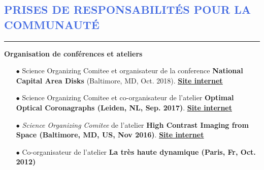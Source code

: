 \documentclass[11pt,a4paper, french]{article}
\begin{document}
\vspace{-0.3cm}
\textcolor{RoyalBlue}{\section{\large PRISES DE RESPONSABILITÉS POUR LA COMMUNAUTÉ}
\vspace{-0.2cm}\hrule}
\vspace{0.4cm}

\textbf{Organisation de conférences et ateliers}\\
\vspace{-0.1cm}
\begin{itemize} \itemsep 5pt
    \item[$\bullet$] \small Science Organizing Comitee et organisateur de la conference  \textbf{National Capital Area Disks} (Baltimore, MD, Oct. 2018). \href{https://sites.google.com/view/ncad7-at-jhu/ncad7}{\underline{\textbf{Site internet}}}
    \item[$\bullet$] \small Science Organizing Comitee et co-organisateur de l'atelier \textbf{Optimal Optical Coronagraphs (Leiden, NL, Sep. 2017)}. \href{https://www.lorentzcenter.nl/lc/web/2017/924/info.php3?wsid=924&venue=Snellius}{\underline{\textbf{Site internet}}}
    \item[$\bullet$] \small \textit{Science Organizing Comitee} de l'atelier \textbf{High Contrast Imaging from Space (Baltimore, MD, US, Nov 2016)}.  \href{http://www.cvent.com/events/high-contrast-imaging-in-space-workshop/event-summary-eb3bb6bd54a342c5a15678daa49be683.aspx}{\underline{\textbf{Site internet}}}
    \item[$\bullet$] \small Co-organisateur de l'atelier \textbf{La très haute dynamique (Paris, Fr, Oct. 2012)}
\end{itemize}
\vspace{0.4cm}
\end{document}
